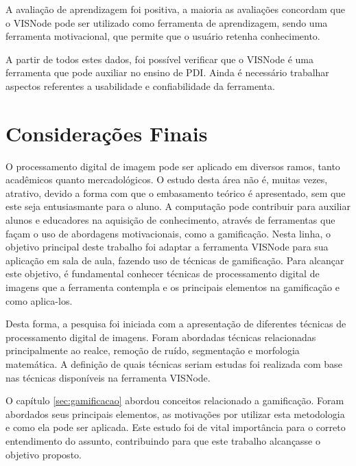 \documentclass[
	12pt,				%
	oneside,			%
	a4paper,			%
	english,			%
	french,				%
	spanish,			%
	brazil,				%
	]{abntex2}
\begin{document}
A avaliação de aprendizagem foi positiva, a maioria as avaliações concordam que o VISNode pode ser utilizado como ferramenta de aprendizagem, sendo uma ferramenta motivacional, que permite que o usuário retenha conhecimento.

A partir de todos estes dados, foi possível verificar que o VISNode é uma ferramenta que pode auxiliar no ensino de PDI. Ainda é necessário trabalhar aspectos referentes a usabilidade e confiabilidade da ferramenta.

% 

\chapter[Considerações Finais]{Considerações Finais}

O processamento digital de imagem pode ser aplicado em diversos ramos, tanto acadêmicos quanto mercadológicos. O estudo desta área não é, muitas vezes, atrativo, devido a forma com que o embasamento teórico é apresentado, sem que este seja entusiasmante para o aluno. A computação pode contribuir para auxiliar alunos e educadores na aquisição de conhecimento, através de ferramentas que façam o uso de abordagens motivacionais, como a gamificação. Nesta linha, o objetivo principal deste trabalho foi adaptar a ferramenta VISNode para sua aplicação em sala de aula, fazendo uso de técnicas de gamificação. Para alcançar este objetivo, é fundamental conhecer técnicas de processamento digital de imagens que a ferramenta contempla e os principais elementos na gamificação e como aplica-los.

Desta forma, a pesquisa foi iniciada com a apresentação de diferentes técnicas de processamento digital de imagens. Foram abordadas técnicas relacionadas principalmente ao realce, remoção de ruído, segmentação e morfologia matemática. A definição de quais técnicas seriam estudas foi realizada com base nas técnicas disponíveis na ferramenta VISNode.

O capítulo \ref{sec:gamificacao} abordou conceitos relacionado a gamificação. Foram abordados seus principais elementos, as motivações por utilizar esta metodologia e como ela pode ser aplicada. Este estudo foi de vital importância para o correto entendimento do assunto, contribuindo para que este trabalho alcançasse o objetivo proposto.
\end{document}
